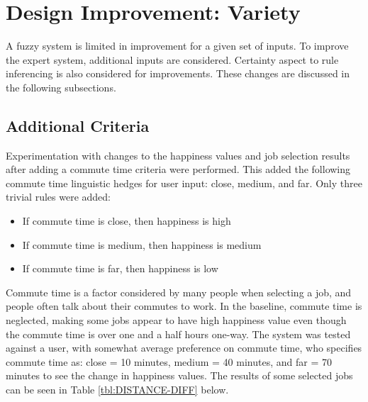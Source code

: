 \documentclass[12pt,fleqn,reqno,letterpaper]{article}
\begin{document}
\nocite{GRAN-3,GRAN-4}

\section{Design Improvement: Variety}
A fuzzy system is limited in improvement for a given set of inputs.  To improve the expert system, additional inputs are considered. Certainty aspect to rule inferencing is also considered for improvements. These changes are discussed in the following subsections.

\subsection{Additional Criteria}
Experimentation with changes to the happiness values and job selection results after adding a commute time criteria were performed. This added the following commute time linguistic hedges for user input: close, medium, and far. Only three trivial rules were added: \\
\begin{itemize}
\item If commute time is close, then happiness is high
\item If commute time is medium, then happiness is medium
\item If commute time is far, then happiness is low
\end{itemize}

Commute time is a factor considered by many people when selecting a job, and people often talk about their commutes to work. In the baseline, commute time is neglected, making some jobs appear to have high happiness value even though the commute time is over one and a half hours one-way.  The system was tested  against a user, with somewhat average preference on commute time, who specifies commute time as: close = 10 minutes, medium = 40 minutes, and far = 70 minutes to see the change in happiness values. The results of some selected jobs can be seen in Table \ref{tbl:DISTANCE-DIFF} below.
\end{document}
